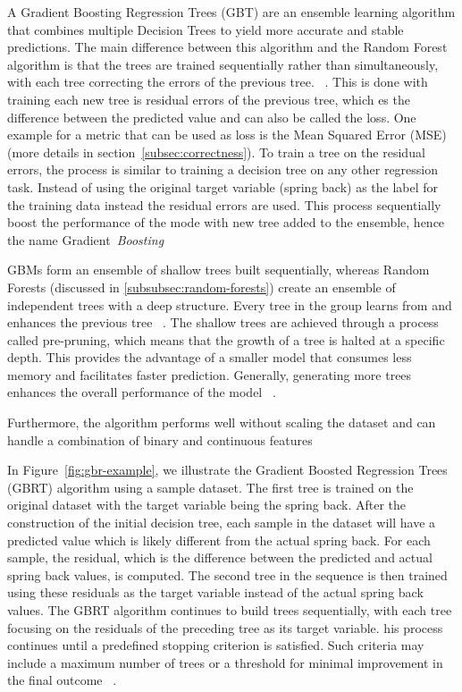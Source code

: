 A Gradient Boosting Regression Trees (\ac{GBT}) are an ensemble learning algorithm that combines multiple Decision Trees
to yield more accurate and stable predictions.
The main difference between this algorithm and the Random Forest algorithm is that the trees are trained sequentially
rather than simultaneously, with each tree correcting the errors of the previous tree.
~\cite[p. 88--89]{muller_introductionmachinelearning_2016}.
This is done with training each new tree is residual errors of the previous tree, which es the
difference between the predicted value and can also be called the loss.
One example for a metric that can be used as loss is the Mean Squared Error (MSE) (more details in
section~\ref{subsec:correctness}).
To train a tree on the residual errors, the process is similar to training a decision tree on any other regression
task.
Instead of using the original target variable (spring back) as the label for the training data instead the
residual errors are used.
This process sequentially boost the performance of the mode with new tree added to the
ensemble, hence the name Gradient~\textit{Boosting}
~\cite[p. 222]{boehmke2019hands}

GBMs form an ensemble of shallow trees built sequentially, whereas Random Forests (discussed in
\cref{subsubsec:random-forests}) create an ensemble of independent trees with a deep structure.
Every tree in the group learns from and enhances the previous tree
~\cite[p. 221]{boehmke2019hands}.
The shallow trees are achieved through a process called pre-pruning, which means that the growth of a tree is halted
at a specific depth.
This provides the advantage of a smaller model that consumes less memory and facilitates faster prediction.
Generally, generating more trees enhances the overall performance of the
model
~\cite[pp. 74, 88--89]{muller_introductionmachinelearning_2016}.

Furthermore, the algorithm performs well without scaling the dataset and can handle a combination of binary and
continuous features
~\cite[p. 91]{muller_introductionmachinelearning_2016}

In Figure~\ref{fig:gbr-example}, we illustrate the Gradient Boosted Regression Trees (GBRT) algorithm using a sample
dataset.
The first tree is trained on the original dataset with the target variable being the spring back.
After the construction of the initial decision tree, each sample in the dataset will have a predicted value which is
likely
different from the actual spring back.
For each sample, the residual, which is the difference between the predicted and actual spring back values, is
computed.
The second tree in the sequence is then trained using these residuals as the target variable instead of the
actual spring back values.
The GBRT algorithm continues to build trees sequentially, with each tree focusing on the residuals of the preceding
tree as its target variable.
his process continues until a predefined stopping criterion is satisfied.
Such criteria may include a maximum number of trees or a threshold for minimal improvement in the final
outcome
~\cite[p. 227]{boehmke2019hands}.

